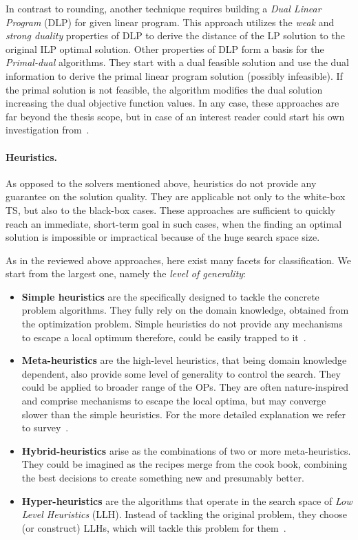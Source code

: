 In contrast to rounding, another technique requires building a \emph{Dual Linear Program} (DLP) for given linear program. This approach utilizes the \emph{weak} and \emph{strong duality} properties of DLP to derive the distance of the LP solution to the original ILP optimal solution. Other properties of DLP form a basis for the \emph{Primal-dual} algorithms. They start with a dual feasible solution and use the dual information to derive the primal linear program solution (possibly infeasible). If the primal solution is not feasible, the algorithm modifies the dual solution increasing the dual objective function values. In any case, these approaches are far beyond the thesis scope, but in case of an interest reader could start his own investigation from~\cite{williamson2011design}. 

\paragraph{Heuristics.} As opposed to the solvers mentioned above, heuristics do not provide any guarantee on the solution quality. They are applicable not only to the white-box TS, but also to the black-box cases. These approaches are sufficient to quickly reach an immediate, short-term goal in such cases, when the finding an optimal solution is impossible or impractical because of the huge search space size.

As in the reviewed above approaches, here exist many facets for classification.
We start from the largest one, namely the \textit{level of generality}:
\begin{itemize}
	\item \textbf{Simple heuristics} are the specifically designed to tackle the concrete problem algorithms. They fully rely on the domain knowledge, obtained from the optimization problem. Simple heuristics do not provide any mechanisms to escape a local optimum therefore, could be easily trapped to it~\cite{pearl1984intelligent}.
	
	\item \textbf{Meta-heuristics} are the high-level heuristics, that being domain knowledge dependent, also provide some level of generality to control the search. They could be applied to broader range of the OPs. They are often nature-inspired and comprise mechanisms to escape the local optima, but may converge slower than the simple heuristics. For the more detailed explanation we refer to survey~\cite{bianchi2009survey}.
	
	\item \textbf{Hybrid-heuristics} arise as the combinations of two or more meta-heuristics. They could be imagined as the recipes merge from the cook book, combining the best decisions to create something new and presumably better.
	
	\item \textbf{Hyper-heuristics} are the algorithms that operate in the search space of \emph{Low Level Heuristics} (LLH). Instead of tackling the original problem, they choose (or construct) LLHs, which will tackle this problem for them~\cite{burke2003hyper}. 
\end{itemize}

